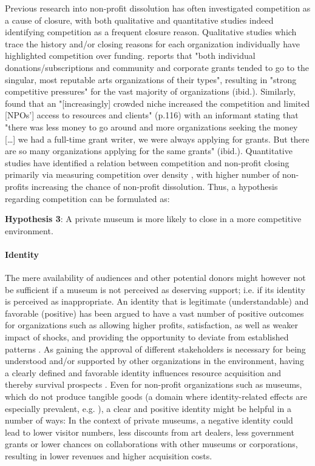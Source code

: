 \documentclass[12pt]{article}
\begin{document}
Previous research into non-profit dissolution has often investigated competition as a cause of closure, with both qualitative and quantitative studies indeed identifying competition as a frequent closure reason.
Qualitative studies which trace the history and/or closing reasons for each organization individually have highlighted competition over funding.
\textcite{Hager_1999_demise} reports that "both individual donations/subscriptions and community and corporate grants tended to go to the singular, most reputable arts organizations of their types", resulting in "strong competitive pressures" for the vast majority of organizations (ibid.).
Similarly, \textcite{HernandezOrtiz_2022_discontinuity} found that an "[increasingly] crowded niche increased the competition and limited [NPOs'] access to resources and clients" (p.116) with an informant stating that "there was less money to go around and more organizations seeking the money [\ldots{}] we had a full-time grant writer, we were always applying for grants. But there are so many organizations applying for the same grants" (ibid.).
Quantitative studies have identified a relation between competition and non-profit closing primarily via measuring competition over density \parencite{Park_Shon_Lu_2021_mortality,Haugh_etal_2021_nascent,Lu_Shon_Zhang_2019_dissolution}, with higher number of non-profits increasing the chance of non-profit dissolution.
Thus, a hypothesis regarding competition can be formulated as:

\textbf{Hypothesis 3}: A private museum is more likely to close in a more competitive environment.
\paragraph*{Identity}

The mere availability of audiences and other potential donors might however not be sufficient if a museum is not perceived as deserving support; i.e. if its identity is perceived as inappropriate. 
An identity that is legitimate (understandable) and favorable (positive) has been argued to have a vast number of positive outcomes for organizations such as allowing higher profits, satisfaction, as well as weaker impact of shocks, and providing the opportunity to deviate from established patterns  \parencite{Lange_Lee_Dai_2010_reputation}. 
As gaining the approval of different stakeholders is necessary for being understood and/or supported by other organizations in the environment, having a clearly defined and favorable identity influences resource acquisition and thereby survival prospects \parencite{Rao_1994_reputation}.
Even for non-profit organizations such as museums, which do not produce tangible goods (a domain where identity-related effects are especially prevalent, e.g. \cite{Hsu_2015_granted,Bogaert_etal_2014_ecological}), a clear and positive identity might be helpful in a number of ways:
In the context of private museums, a negative identity could lead to lower visitor numbers, less discounts from art dealers, less government grants or lower chances on collaborations with other museums or corporations, resulting in lower revenues and higher acquisition costs.
\end{document}
